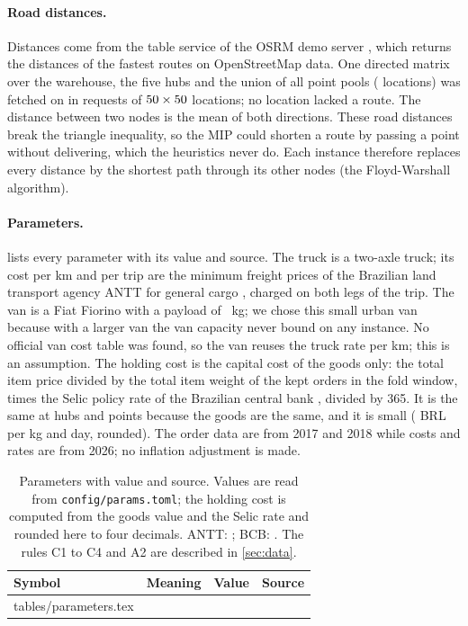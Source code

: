 \documentclass[11pt,a4paper]{article}
\makeatletter
\newcommand{\tablebody}[1]{\@@input tables/#1.tex }
\makeatother
\begin{document}
\paragraph{Road distances.}
Distances come from the table service of the OSRM demo server \citep{luxen2011real}, which returns
the distances of the fastest routes on OpenStreetMap data. One directed matrix over the warehouse,
the five hubs and the union of all point pools (\osrmPoints{} locations) was fetched on
\osrmDate{} in \osrmRequests{} requests of $50 \times 50$ locations; no location
lacked a route. The distance between two nodes is the mean of both directions. These road distances break the triangle inequality, so the MIP could shorten a route by passing a
point without delivering, which the heuristics never do. Each instance therefore replaces every
distance by the shortest path through its other nodes (the Floyd-Warshall algorithm).

\paragraph{Parameters.}
 lists every parameter with its value and source. The truck is a two-axle truck;
its cost per km and per trip are the minimum freight prices of the Brazilian land transport agency
ANTT for general cargo \citep{antt2026resolucao6084}, charged on both legs of the trip. The van is a
Fiat Fiorino with a payload of \vanCapacity{}~kg; we chose this small urban van because with a
larger van the van capacity never bound on any instance. No official van cost table was found, so
the van reuses the truck rate per km; this is an assumption. The holding cost is the capital cost
of the goods only: the total item price divided by the total item weight of the kept orders in the
fold window, times the Selic policy rate of the Brazilian central bank \citep{bcb2026selic}, divided by 365. It is the same at hubs and points
because the goods are the same, and it is small (\holdingValue{} BRL per kg and day, rounded). The
order data are from 2017 and 2018 while costs and rates are from 2026; no inflation adjustment is
made.

\begin{table}[!tbp]
\centering\footnotesize
\caption{Parameters with value and source. Values are read from \texttt{config/params.toml}; the
holding cost is computed from the goods value and the Selic rate and rounded here to four decimals. ANTT: \citet{antt2026resolucao6084}; BCB: \citet{bcb2026selic}.
The rules C1 to C4 and A2 are described in \cref{sec:data}.}
\label{tab:params}
\begin{tabular}{llrp{6.2cm}}
\toprule
Symbol & Meaning & Value & Source \\
\midrule
\tablebody{parameters}
\bottomrule
\end{tabular}
\end{table}
\end{document}
